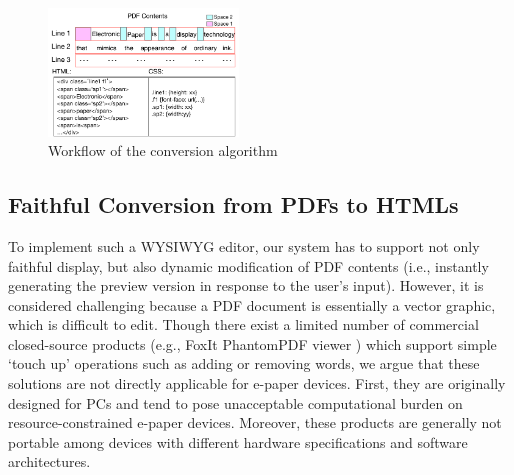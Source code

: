 \documentclass[]{sigchi}
\begin{document}
\begin{figure}[t]
\begin{center}
\includegraphics[width=0.45\textwidth]{figures/htmlconvert}
\caption{Workflow of the conversion algorithm}
\label{fig:convertexample}
\end{center}
\end{figure}






\subsection{Faithful Conversion from PDFs to HTMLs}
To implement such a WYSIWYG editor, our system has to support not only faithful display, but also dynamic modification of PDF contents (i.e., instantly generating the preview version in response to the user's input). 
However, it is considered challenging because a PDF document is essentially a vector graphic, which is difficult to edit.
Though there exist a limited number of commercial closed-source products (e.g., FoxIt PhantomPDF viewer \cite{foxitreader}) which support simple `touch
up' operations such as adding or removing words, we argue that these solutions are not directly applicable for e-paper devices. First, they are originally designed for PCs and tend to pose unacceptable computational burden on resource-constrained e-paper devices. Moreover, these products are generally not portable among devices with different hardware specifications and software architectures.
\end{document}
